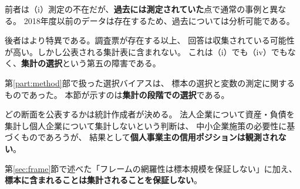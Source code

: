 前者は（i）測定の不在だが、\textbf{過去には測定されていた}点で通常の事例と異なる。
2018年度以前のデータは存在するため、過去については分析可能である。

後者はより特異である。調査票が存在する以上、
回答は収集されている可能性が高い。しかし公表される集計表に含まれない。
これは（i）でも（iv）でもなく、\textbf{集計の選択}という第五の障害である。

\begin{remark}[集計の選択が観測を規定する]
\label{rem:tabulation-choice}
第\ref{part:method}部で扱った選択バイアスは、
標本の選択と変数の測定に関するものであった。
本節が示すのは\textbf{集計の段階での選択}である。

どの断面を公表するかは統計作成者が決める。
法人企業について資産・負債を集計し個人企業について集計しないという判断は、
中小企業施策の必要性に基づくものであろうが、
結果として\textbf{個人事業主の信用ポジションは観測されない}。

第\ref{sec:frame}節で述べた「フレームの網羅性は標本規模を保証しない」に加え、
\textbf{標本に含まれることは集計されることを保証しない}。
\end{remark}





